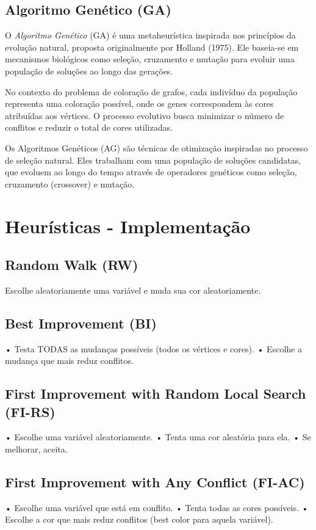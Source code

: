 \documentclass[12pt,a4paper]{article}
\begin{document}
\subsection{Algoritmo Genético (GA)}
O \textit{Algoritmo Genético} (GA) é uma metaheurística inspirada nos princípios da evolução natural, proposta originalmente por Holland (1975). Ele baseia-se em mecanismos biológicos como seleção, cruzamento e mutação para evoluir uma população de soluções ao longo das gerações.

No contexto do problema de coloração de grafos, cada indivíduo da população representa uma coloração possível, onde os genes correspondem às cores atribuídas aos vértices. O processo evolutivo busca minimizar o número de conflitos e reduzir o total de cores utilizadas.

Os Algoritmos Genéticos (AG) são técnicas de otimização inspiradas no processo de seleção natural. Eles trabalham com uma população de soluções candidatas, que evoluem ao longo do tempo através de operadores genéticos como seleção, cruzamento (crossover) e mutação.

\section{Heurísticas - Implementação}

\subsection{Random Walk (RW)}
Escolhe aleatoriamente uma variável e muda sua cor aleatoriamente.

\subsection{Best Improvement (BI)}
• Testa TODAS as mudanças possíveis (todos os vértices e cores).
• Escolhe a mudança que mais reduz conflitos.

\subsection{First Improvement with Random Local Search (FI-RS)}
• Escolhe uma variável aleatoriamente.
• Tenta uma cor aleatória para ela.
• Se melhorar, aceita.

\subsection{First Improvement with Any Conflict (FI-AC)}
• Escolhe uma variável que está em conflito.
• Tenta todas as cores possíveis.
• Escolhe a cor que mais reduz conflitos (best color para aquela variável).
\end{document}
